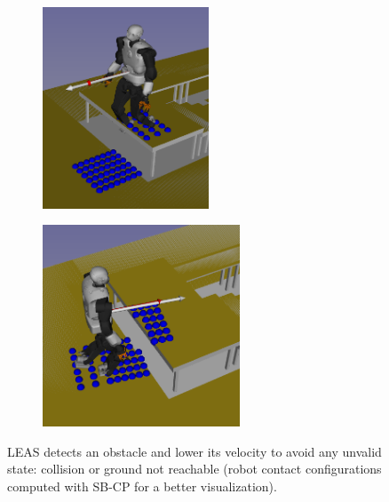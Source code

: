 
\begin{figure}
    \centering
    \captionsetup[subfigure]{justification=centering}
    \begin{subfigure}[t]{0.43\linewidth}
    \includegraphics[width=\textwidth,height=6cm]{Figures/Chapter_LEAS/stop_bauzil_0.png}
    \end{subfigure}
    \begin{subfigure}[t]{0.43\linewidth}
    \includegraphics[width=\textwidth,height=6cm]{Figures/Chapter_LEAS/stop_bauzil_1.png}
    \end{subfigure}
    \label{fig:leas_stop_void_obstacle}
    \caption{LEAS detects an obstacle and lower its velocity to avoid any unvalid state: collision or ground not reachable (robot contact configurations computed with SB-CP for a better visualization).}
\end{figure}

